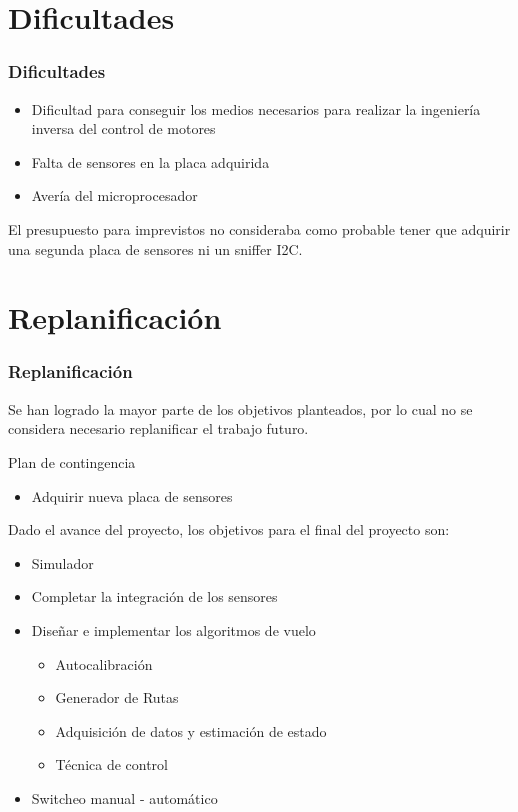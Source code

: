\documentclass[slidestop,compress,mathserif,xcolor=svgnames,table]{beamer}
\begin{document}
\section{Dificultades}
\begin{frame}
\frametitle{Dificultades}

\begin{itemize}
	\item Dificultad para conseguir los medios necesarios para realizar la ingenier\'ia inversa del control de motores \pause
	\item Falta de sensores en la placa adquirida\pause
	\item Aver\'ia del microprocesador
\end{itemize}
\pause
El presupuesto para imprevistos no consideraba como probable tener que adquirir una segunda placa de sensores ni un sniffer I2C.\\
\end{frame}

\section{Replanificaci\'on}
\begin{frame}
\frametitle{Replanificaci\'on}

Se han logrado la mayor parte de los objetivos planteados, por lo cual no se considera necesario replanificar el trabajo futuro. \pause

\vspace{8pt}

\begin{Large}
Plan de contingencia
\end{Large}
\pause
\begin{itemize}
	\item Adquirir nueva placa de sensores \pause
\end{itemize}

\vspace{15pt}
\pause
Dado el avance del proyecto, los objetivos para el final del proyecto son:
\pause
\begin{itemize}
	\item Simulador \pause
	\item Completar la integraci\'on de los sensores \pause
	\item Dise\~nar e implementar los algoritmos de vuelo \pause
	\begin{itemize}
		\item Autocalibraci\'on
		\item Generador de Rutas
		\item Adquisici\'on de datos y estimaci\'on de estado
		\item T\'ecnica de control
	\end{itemize}
	\item Switcheo manual - autom\'atico
\end{itemize}
\end{frame}
\end{document}
